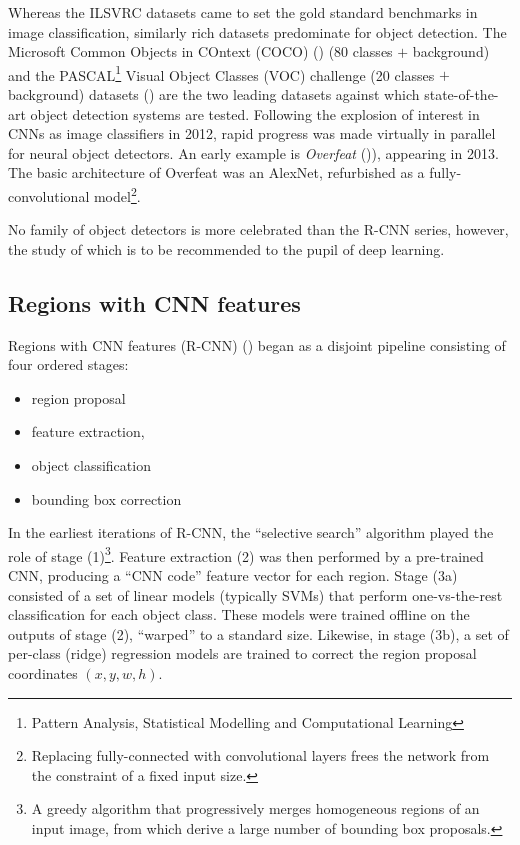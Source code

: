Whereas the ILSVRC datasets came to set the gold standard benchmarks in image classification, similarly rich datasets predominate for object detection. The Microsoft Common Objects in COntext (COCO) (\cite{lin2014microsoft}) (80 classes $+$ background) and the PASCAL\footnote{Pattern Analysis, Statistical Modelling and Computational Learning} Visual Object Classes (VOC) challenge (20 classes $+$ background) datasets (\cite{everingham2010pascal}) are the two leading datasets against which state-of-the-art object detection systems are tested.  Following the explosion of interest in CNNs as image classifiers in 2012, rapid progress was made virtually in parallel for neural object detectors. An early example is \emph{Overfeat} (\cite{sermanet2013overfeat})), appearing in 2013. The basic architecture of Overfeat was an AlexNet, refurbished as a fully-convolutional model\footnote{Replacing fully-connected with convolutional layers frees the network from the constraint of a fixed input size.}. 

No family of object detectors is more celebrated than the R-CNN series, however, the study of which is to be recommended to the pupil of deep learning.

\subsection{Regions with CNN features}

Regions with CNN features (R-CNN) (\cite{girshick2014rich}) began as a disjoint pipeline consisting of four ordered stages:

\begin{itemize}
\item[(1)] region proposal
\item[(2)] feature extraction,
\item[(3a)] object classification 
\item[(3b)] bounding box correction
\end{itemize}

In the earliest iterations of R-CNN, the ``selective search'' algorithm played the role of stage (1)\footnote{A greedy algorithm that progressively merges homogeneous regions of an input image, from which derive a large number of bounding box proposals.}. Feature extraction (2) was then performed by a pre-trained CNN, producing a ``CNN code'' feature vector for each region. Stage (3a) consisted of a set of linear models (typically SVMs) that perform one-vs-the-rest classification for each object class. These models were trained offline on the outputs of stage (2), ``warped'' to a standard size. Likewise, in stage (3b), a set of per-class (ridge) regression models are trained to correct the region proposal coordinates $(x, y, w, h)$.

